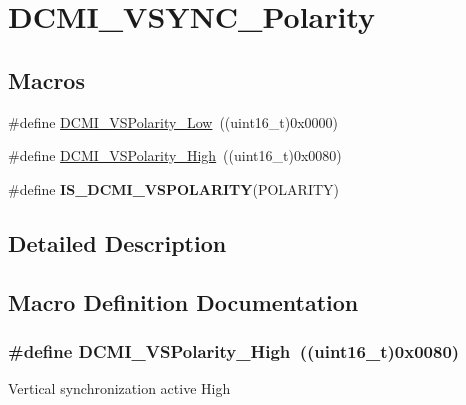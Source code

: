 \hypertarget{group___d_c_m_i___v_s_y_n_c___polarity}{}\section{D\+C\+M\+I\+\_\+\+V\+S\+Y\+N\+C\+\_\+\+Polarity}
\label{group___d_c_m_i___v_s_y_n_c___polarity}
\subsection*{Macros}
\begin{DoxyCompactItemize}
\item 
\#define \hyperlink{group___d_c_m_i___v_s_y_n_c___polarity_ga7373470d26c50a616f12b2855b29b240}{D\+C\+M\+I\+\_\+\+V\+S\+Polarity\+\_\+\+Low}~((uint16\+\_\+t)0x0000)
\item 
\#define \hyperlink{group___d_c_m_i___v_s_y_n_c___polarity_ga8ee9a81f7d657b0121ddff9ce0ae9bec}{D\+C\+M\+I\+\_\+\+V\+S\+Polarity\+\_\+\+High}~((uint16\+\_\+t)0x0080)
\item 
\#define {\bfseries I\+S\+\_\+\+D\+C\+M\+I\+\_\+\+V\+S\+P\+O\+L\+A\+R\+I\+T\+Y}(P\+O\+L\+A\+R\+I\+T\+Y)
\end{DoxyCompactItemize}


\subsection{Detailed Description}


\subsection{Macro Definition Documentation}
\hypertarget{group___d_c_m_i___v_s_y_n_c___polarity_ga8ee9a81f7d657b0121ddff9ce0ae9bec}{}
\subsubsection[{D\+C\+M\+I\+\_\+\+V\+S\+Polarity\+\_\+\+High}]{\setlength{\rightskip}{0pt plus 5cm}\#define D\+C\+M\+I\+\_\+\+V\+S\+Polarity\+\_\+\+High~((uint16\+\_\+t)0x0080)}\label{group___d_c_m_i___v_s_y_n_c___polarity_ga8ee9a81f7d657b0121ddff9ce0ae9bec}
Vertical synchronization active High \hypertarget{group___d_c_m_i___v_s_y_n_c___polarity_ga7373470d26c50a616f12b2855b29b240}{}

